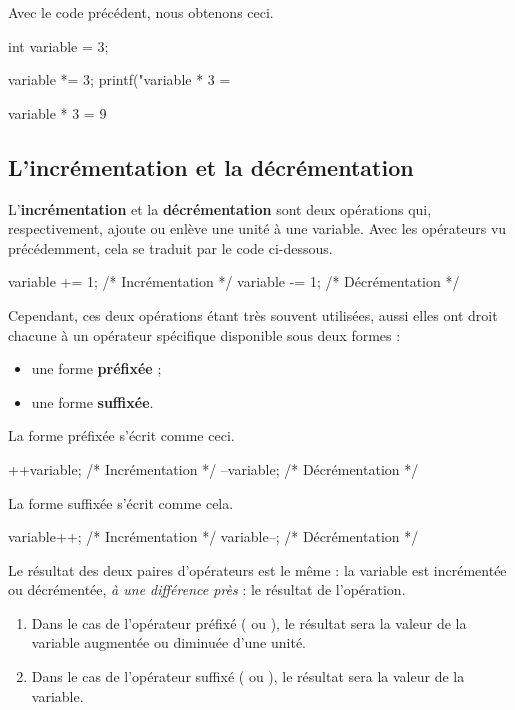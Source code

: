 Avec le code précédent, nous obtenons ceci.

\begin{C}
int variable = 3;

variable *= 3;
printf("variable * 3 = %
\end{C}

\begin{C}
variable * 3 = 9
\end{C}

\subsection{L'incrémentation et la décrémentation}
\label{lincrementation-et-la-decrementation}

L'\textbf{incrémentation} et la \textbf{décrémentation} sont deux
opérations qui, respectivement, ajoute ou enlève une unité à une
variable. Avec les opérateurs vu précédemment, cela se traduit par le
code ci-dessous.

\begin{C}
variable += 1; /* Incrémentation */
variable -= 1; /* Décrémentation */
\end{C}

Cependant, ces deux opérations étant très souvent utilisées, aussi elles
ont droit chacune à un opérateur spécifique disponible sous deux formes
:

\begin{itemize}
\item
  une forme \textbf{préfixée} ;
\item
  une forme \textbf{suffixée}.
\end{itemize}

La forme préfixée s'écrit comme ceci.

\begin{C}
++variable; /* Incrémentation */
--variable; /* Décrémentation */
\end{C}

La forme suffixée s'écrit comme cela.

\begin{C}
variable++; /* Incrémentation */
variable--; /* Décrémentation */
\end{C}

Le résultat des deux paires d'opérateurs est le même : la variable
 est incrémentée ou décrémentée, \emph{à une différence
près} : le résultat de l'opération.

\begin{enumerate}
\def\labelenumi{\arabic{enumi}.}
\item
  Dans le cas de l'opérateur préfixé ( ou
  ), le résultat sera la valeur de la variable
  augmentée ou diminuée d'une unité.
\item
  Dans le cas de l'opérateur suffixé ( ou
  ), le résultat sera la valeur de la variable.
\end{enumerate}

